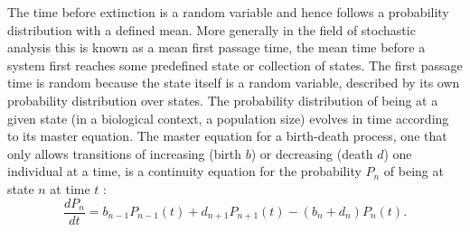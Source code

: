 The time before extinction is a random variable and hence follows a probability distribution with a defined mean. 
More generally in the field of stochastic analysis this is known as a mean first passage time, the mean time before a system first reaches some predefined state or collection of states. 
The first passage time is random because the state itself is a random variable, described by its own probability distribution over states. 
The probability distribution of being at a given state (in a biological context, a population size) evolves in time according to its master equation. 
The master equation for a birth-death process, one that only allows transitions of increasing (birth $b$) or decreasing (death $d$) one individual at a time, is a continuity equation for the probability $P_n$ of being at state $n$ at time $t$ \cite{Nisbet1982,Gardiner2004a}:
\begin{equation}
\frac{dP_n}{dt} =  b_{n-1}P_{n-1}(t) + d_{n+1}P_{n+1}(t) - (b_n+d_n)P_n(t).
\label{master-eqn-intro}
\end{equation}
\fi
\iffalse
\begin{figure}[h]
	\centering
	\texttt{[image: lattice-fig2]}
	\caption{\emph{Each realization of a birth-death process is a random walk on a lattice.} Each node of the lattice corresponds to a population size. Birth jumps the system one node to the right and death moves it one left, toward the absorbing state at zero population. A system with one species only need a one dimensional lattice; each additional species requires an additional dimension to represent the combination of populations for each species. The master equation describes how a probability distribution on the lattice evolves in time. 
	} \label{latticefig}
\end{figure}
\fi

